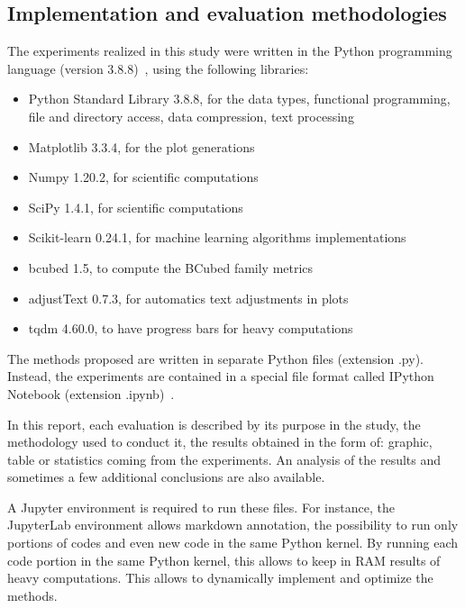 \subsection{Implementation and evaluation methodologies}

The experiments realized in this study were written in the Python programming language (version 3.8.8)~\cite{python}, using the following libraries:

\begin{itemize}
  \item Python Standard Library 3.8.8, for the data types, functional programming, file and directory access, data compression, text processing~\cite{python_standard_library}
  \item Matplotlib 3.3.4, for the plot generations~\cite{matplotlib}
  \item Numpy 1.20.2, for scientific computations~\cite{numpy}
  \item SciPy 1.4.1, for scientific computations~\cite{scipy}
  \item Scikit-learn 0.24.1, for machine learning algorithms implementations~\cite{sklearn}
  \item bcubed 1.5, to compute the BCubed family metrics~\cite{bcubed_gh}
  \item adjustText 0.7.3, for automatics text adjustments in plots~\cite{adjustText}
  \item tqdm 4.60.0, to have progress bars for heavy computations~\cite{tqdm}
\end{itemize}

The methods proposed are written in separate Python files (extension .py).
Instead, the experiments are contained in a special file format called IPython Notebook (extension .ipynb)~\cite{jupyter}.

In this report, each evaluation is described by its purpose in the study, the methodology used to conduct it, the results obtained in the form of: graphic, table or statistics coming from the experiments.
An analysis of the results and sometimes a few additional conclusions are also available.

A Jupyter environment is required to run these files.
For instance, the JupyterLab environment allows markdown annotation, the possibility to run only portions of codes and even new code in the same Python kernel.
By running each code portion in the same Python kernel, this allows to keep in RAM results of heavy computations.
This allows to dynamically implement and optimize the methods.
